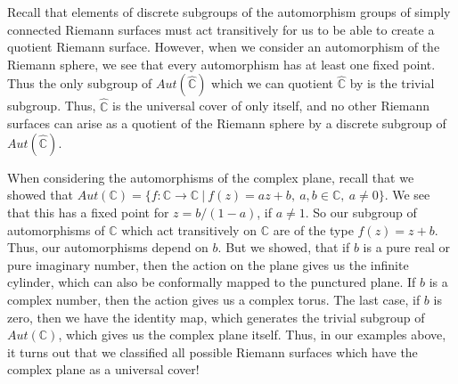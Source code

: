 \documentclass[11pt]{report}
\theoremstyle{definition}
\begin{document}
Recall that elements of discrete subgroups of the automorphism groups of simply connected Riemann surfaces must act transitively for us to be able to create a quotient Riemann surface. However, when we consider an automorphism of the Riemann sphere, we see that every automorphism has at least one fixed point. Thus the only subgroup of $Aut(\widehat{\mathbb{C}})$ which we can quotient $\widehat{\mathbb{C}}$ by is the trivial subgroup. Thus, $\widehat{\mathbb{C}}$ is the universal cover of only itself, and no other Riemann surfaces can arise as a quotient of the Riemann sphere by a discrete subgroup of $Aut(\widehat{\mathbb{C}})$.

When considering the automorphisms of the complex plane, recall that we showed that $Aut(\mathbb{C})= \{f:\mathbb{C}\rightarrow \mathbb{C} \ \vert \ f(z) = az + b, \ a,b\in\mathbb{C}, \ a \neq 0\}$. We see that this has a fixed point for $z = b/(1-a)$, if $a \neq 1$. So our subgroup of automorphisms of $\mathbb{C}$ which act transitively on $\mathbb{C}$ are of the type $f(z) = z + b$. Thus, our automorphisms depend on $b$. But we showed, that if $b$ is a pure real or pure imaginary number, then the action on the plane gives us the infinite cylinder, which can also be conformally mapped to the punctured plane. If $b$ is a complex number, then the action gives us a complex torus. The last case, if $b$ is zero, then we have the identity map, which generates the trivial subgroup of $Aut(\mathbb{C})$, which gives us the complex plane itself. Thus, in our examples above, it turns out that we classified all possible Riemann surfaces which have the complex plane as a universal cover!
\end{document}
